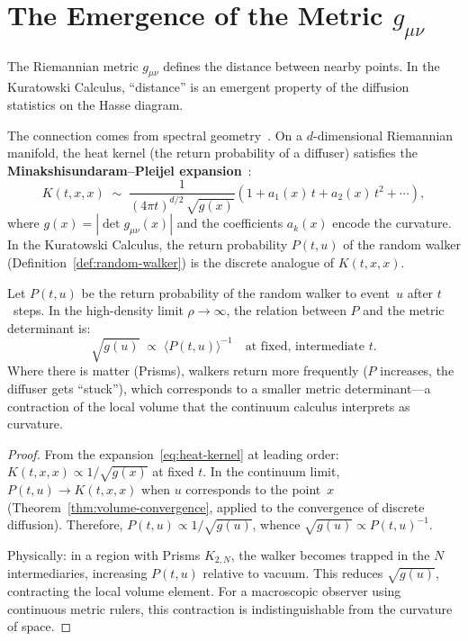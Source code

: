 \section{The Emergence of the Metric $g_{\mu\nu}$}

The Riemannian metric $g_{\mu\nu}$ defines the distance between
nearby points. In the Kuratowski Calculus, ``distance'' is an
emergent property of the diffusion statistics on the Hasse diagram.

The connection comes from spectral
geometry~\cite{gilkey1975,berger2003}. On a $d$-dimensional Riemannian
manifold, the heat kernel (the return probability of a diffuser)
satisfies the \textbf{Minakshisundaram--Pleijel
expansion}~\cite{minakshisundaram1949}:
\begin{equation}
  K(t, x, x)
  \;\sim\;
  \frac{1}{(4\pi t)^{d/2}\,\sqrt{g(x)}}
  \left(1 + a_1(x)\,t + a_2(x)\,t^2 + \cdots\right),
  \label{eq:heat-kernel}
\end{equation}
where $g(x) = |\det g_{\mu\nu}(x)|$ and the coefficients $a_k(x)$
encode the curvature. In the Kuratowski Calculus, the return
probability $P(t, u)$ of the random walker
(Definition~\ref{def:random-walker}) is the discrete analogue of
$K(t, x, x)$.

\begin{theorem}
\label{thm:emergent-metric}
Let $P(t, u)$ be the return probability of the random walker to
event~$u$ after $t$~steps. In the high-density limit
$\rho \to \infty$, the relation between $P$ and the metric
determinant is:
\begin{equation}
  \boxed{\;
  \sqrt{g(u)}
  \;\propto\;
  \bigl\langle P(t, u) \bigr\rangle^{-1}
  \quad\text{at fixed, intermediate $t$.}
  \;}
  \label{eq:metric-from-return}
\end{equation}
Where there is matter (Prisms), walkers return more frequently ($P$
increases, the diffuser gets ``stuck''), which corresponds to a
smaller metric determinant---a contraction of the local volume that
the continuum calculus interprets as curvature.
\end{theorem}

\begin{proof}
From the expansion~\eqref{eq:heat-kernel} at leading order:
$K(t, x, x) \propto 1/\sqrt{g(x)}$ at fixed $t$. In the continuum
limit, $P(t, u) \to K(t, x, x)$ when $u$ corresponds to the
point~$x$ (Theorem~\ref{thm:volume-convergence}, applied to the
convergence of discrete diffusion). Therefore,
$P(t, u) \propto 1/\sqrt{g(u)}$, whence
$\sqrt{g(u)} \propto P(t, u)^{-1}$.

Physically: in a region with Prisms $K_{2,N}$, the walker becomes
trapped in the $N$ intermediaries, increasing $P(t,u)$ relative to
vacuum. This reduces $\sqrt{g(u)}$, contracting the local volume
element. For a macroscopic observer using continuous metric rulers,
this contraction is indistinguishable from the curvature of space.
\end{proof}

